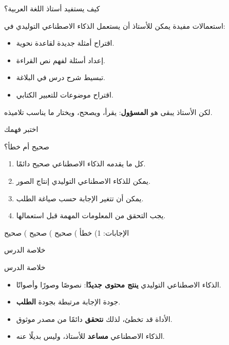 \documentclass[aspectratio=169, 11pt, xcolor={table}]{beamer}
\begin{document}
\begin{frame}{كيف يستفيد أستاذ اللغة العربية؟}
    \begin{tbox}{\faChalkboardTeacher\quad استعمالات مفيدة}
        يمكن للأستاذ أن يستعمل الذكاء الاصطناعي التوليدي في:
        \begin{itemize}
            \item اقتراح أمثلة جديدة لقاعدة نحوية.
            \item إعداد أسئلة لفهم نص القراءة.
            \item تبسيط شرح درس في البلاغة.
            \item اقتراح موضوعات للتعبير الكتابي.
        \end{itemize}
    \end{tbox}
    لكن الأستاذ يبقى هو \textbf{المسؤول}: يقرأ، ويصحح، ويختار ما يناسب تلاميذه.
\end{frame}

\begin{frame}{اختبر فهمك}
    \begin{tbox}{\faQuestionCircle\quad صحيح أم خطأ؟}
        \begin{enumerate}
            \item كل ما يقدمه الذكاء الاصطناعي صحيح دائمًا.
            \item يمكن للذكاء الاصطناعي التوليدي إنتاج الصور.
            \item يمكن أن تتغير الإجابة حسب صياغة الطلب.
            \item يجب التحقق من المعلومات المهمة قبل استعمالها.
        \end{enumerate}
    \end{tbox}
    {\small\color{brandMuted} الإجابات: 1) خطأ ) صحيح ) صحيح ) صحيح}
\end{frame}

\begin{frame}{خلاصة الدرس}
    \begin{tbox}{\faCheckCircle\quad خلاصة الدرس}
        \begin{itemize}
            \item الذكاء الاصطناعي التوليدي \textbf{ينتج محتوى جديدًا}:
                  نصوصًا وصورًا وأصواتًا.
            \item جودة الإجابة مرتبطة بجودة \textbf{الطلب}.
            \item الأداة قد تخطئ، لذلك \textbf{نتحقق} دائمًا من مصدر موثوق.
            \item الذكاء الاصطناعي \textbf{مساعد} للأستاذ، وليس بديلًا عنه.
        \end{itemize}
    \end{tbox}
\end{frame}
\end{document}
